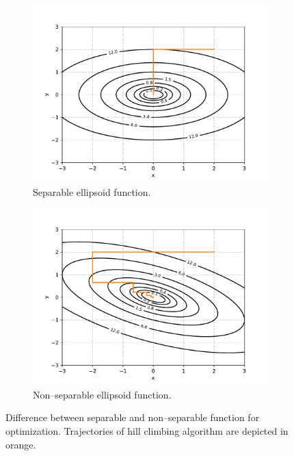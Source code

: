 \begin{figure}
    \begin{subfigure}[t]{0.49\textwidth}
        \includegraphics[width=\textwidth]{img/render_separable.pdf}
        \caption{Separable ellipsoid function.}
        \label{fig:separableelipsoid}
    \end{subfigure}
    \hfill
    \begin{subfigure}[t]{0.49\textwidth}
        \includegraphics[width=\textwidth]{img/render_nonseparable.pdf}
        \caption{Non--separable ellipsoid function.}
        \label{fig:nonseparableelipsoid}
    \end{subfigure}
    \caption[Difference between separable and non--separable function for optimization]{Difference between separable and non--separable function for optimization. Trajectories of hill climbing algorithm are depicted in orange.}
    \label{fig:separationfucntions}
\end{figure}

